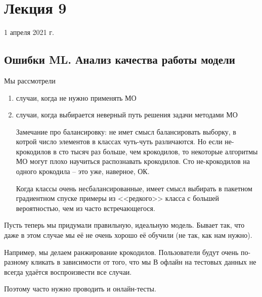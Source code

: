 \documentclass[main.tex]{subfiles}
\begin{document}
\section{Лекция 9}

1 апреля 2021 г.

\subsection{Ошибки ML. Анализ качества работы модели}

Мы рассмотрели

\begin{enumerate}[noitemsep]
	\item случаи, когда не нужно применять МО
	\item случаи, когда выбирается неверный путь решения задачи методами МО

	Замечание про балансировку:
	не имет смысл балансировать выборку, в котрой число элементов в классах чуть-чуть различаются.
	Но если не-крокодилов в сто тысяч раз больше, чем крокодилов, то некоторые алгоритмы МО могут плохо научиться распознавать крокодилов.
	Сто не-крокодилов на одного крокодила -- это уже, наверное, ОК.

	Когда классы очень несбалансированные, имеет смысл выбирать в пакетном градиентном спуске примеры из <<редкого>> класса с большей вероятностью, чем из часто встречающегося.

\end{enumerate}

Пусть теперь мы придумали правильную, идеальную модель.
Бывает так, что даже в этом случае мы её не очень хорошо её обучили (не так, как нам нужно).

Например, мы делаем ранжирование крокодилов.
Пользователи будут очень по-разному кликать в зависимости от того, что мы
В офлайн на тестовых данных не всегда удаётся воспроизвести все случаи.

Поэтому часто нужно проводить и онлайн-тесты.
\end{document}
